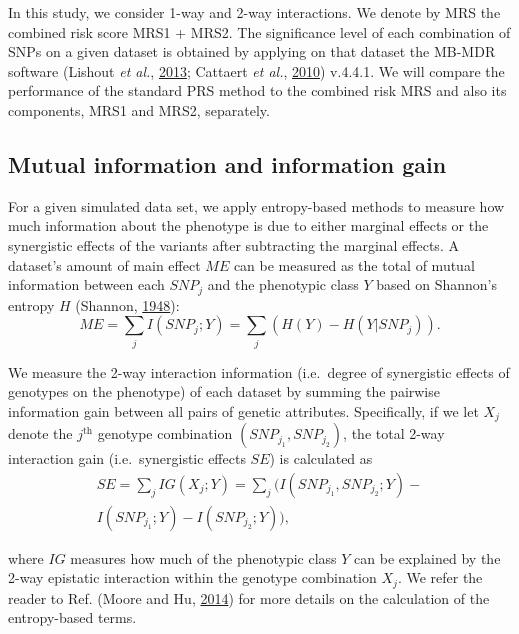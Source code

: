 \documentclass[a4paper,twoside, 9pt]{article}
\begin{document}
In this study, we consider 1-way and 2-way interactions. We denote by
MRS the combined risk score MRS1 + MRS2. The significance level of each
combination of SNPs on a given dataset is obtained by applying on that
dataset the MB-MDR software (Lishout \emph{et al.},
\protect\hyperlink{ref-S6nj6BFK}{2013}; Cattaert \emph{et al.},
\protect\hyperlink{ref-16AnEAMje}{2010}) v.4.4.1. We will compare the
performance of the standard PRS method to the combined risk MRS and also
its components, MRS1 and MRS2, separately.

\subsection{Mutual information and information
gain}\label{mutual-information-and-information-gain}

\noindent For a given simulated data set, we apply entropy-based methods to
measure how much information about the phenotype is due to either
marginal effects or the synergistic effects of the variants after
subtracting the marginal effects. A dataset's amount of main effect
\(ME\) can be measured as the total of mutual information between each
\(SNP_j\) and the phenotypic class \(Y\) based on Shannon's
entropy \(H\) (Shannon, \protect\hyperlink{ref-yzGboP1g}{1948}):
\begin{equation}\label{eq3}
ME = \sum_{j} I(SNP_j; Y) = \sum_{j} \left(H(Y) - H(Y|SNP_j)\right).
\end{equation}

We measure the 2-way interaction information (i.e.~degree of synergistic
effects of genotypes on the phenotype) of each dataset by summing the
pairwise information gain between all pairs of genetic attributes.
Specifically, if we let \(X_j\) denote the \(j^\textrm{th}\) genotype
combination \((SNP_{j_1}, SNP_{j_2})\), the total 2-way interaction gain
(i.e.~synergistic effects \(SE\)) is calculated as
\begin{multline}
SE = \sum_{j}IG(X_j; Y)= \sum_{j} (I(SNP_{j_1}, SNP_{j_2}; Y) -\\ I(SNP_{j_1}; Y) - I(SNP_{j_2}; Y)),
\end{multline}

where \(IG\) measures how much of the phenotypic class \(Y\) can be
explained by the 2-way epistatic interaction within the genotype
combination \(X_j\). We refer the reader to Ref. (Moore and Hu,
\protect\hyperlink{ref-1FFMLUZxb}{2014}) for more details on the
calculation of the entropy-based terms.
\end{document}
